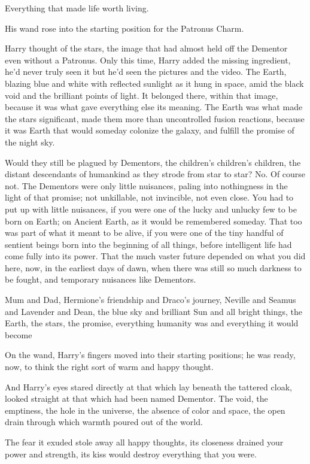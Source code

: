 Everything that made life worth living.

His wand rose into the starting position for the Patronus Charm.

Harry thought of the stars, the image that had almost held off the Dementor
even without a Patronus. Only this time, Harry added the missing ingredient,
he'd never truly seen it but he'd seen the pictures and the video. The Earth,
blazing blue and white with reflected sunlight as it hung in space, amid the
black void and the brilliant points of light. It belonged there, within that
image, because it was what gave everything else its meaning. The Earth was what
made the stars significant, made them more than uncontrolled fusion reactions,
because it was Earth that would someday colonize the galaxy, and fulfill the
promise of the night sky.

Would they still be plagued by Dementors, the children's children's children,
the distant descendants of humankind as they strode from star to star? No. Of
course not. The Dementors were only little nuisances, paling into nothingness
in the light of that promise; not unkillable, not invincible, not even close.
You had to put up with little nuisances, if you were one of the lucky and
unlucky few to be born on Earth; on Ancient Earth, as it would be remembered
someday. That too was part of what it meant to be alive, if you were one of the
tiny handful of sentient beings born into the beginning of all things, before
intelligent life had come fully into its power. That the much vaster future
depended on what you did here, now, in the earliest days of dawn, when there
was still so much darkness to be fought, and temporary nuisances like Dementors.

Mum and Dad, Hermione's friendship and Draco's journey, Neville and Seamus and
Lavender and Dean, the blue sky and brilliant Sun and all bright things, the
Earth, the stars, the promise, everything humanity was and everything it would
become{\el}

On the wand, Harry's fingers moved into their starting positions; he was ready,
now, to think the right sort of warm and happy thought.

And Harry's eyes stared directly at that which lay beneath the tattered cloak,
looked straight at that which had been named Dementor. The void, the emptiness,
the hole in the universe, the absence of color and space, the open drain
through which warmth poured out of the world.

The fear it exuded stole away all happy thoughts, its closeness drained your
power and strength, its kiss would destroy everything that you were.

